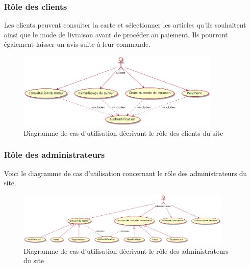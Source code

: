\subsubsection{Rôle des clients}
Les clients peuvent consulter la carte et sélectionner les articles qu'ils souhaitent ainsi que le mode de livraison avant de procéder au paiement. Ils pourront également laisser un avis suite à leur commande.

\begin{figure}[H]
\begin{centering}
\includegraphics[width=0.9\textwidth,height=0.3\textheight]{Ressources/Client.png}
\caption{Diagramme de cas d'utilisation décrivant le rôle des clients du site}
\par
\end{centering}
\end{figure}

\clearpage



\subsubsection{Rôle des administrateurs}
Voici le diagramme de cas d'utilisation concernant le rôle des administrateurs du site.

\begin{figure}[H]
\begin{centering}
\includegraphics[width=0.95\textwidth,height=0.25\textheight]{Ressources/Administrateur.png}
\caption{Diagramme de cas d'utilisation décrivant le rôle des administrateurs du site}
\par
\end{centering}
\end{figure}

\clearpage
